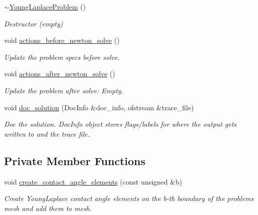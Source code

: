 \begin{DoxyCompactItemize}
\hyperlink{classYoungLaplaceProblem_aa3482606bfd86a3db9d2dec86ba75f14}{$\sim$\+Young\+Laplace\+Problem} ()
\begin{DoxyCompactList}\small\item\em Destructor (empty) \end{DoxyCompactList}\item 
void \hyperlink{classYoungLaplaceProblem_a93dd45313d28c3b9b0b51e34d14ebd24}{actions\+\_\+before\+\_\+newton\+\_\+solve} ()
\begin{DoxyCompactList}\small\item\em Update the problem specs before solve. \end{DoxyCompactList}\item 
void \hyperlink{classYoungLaplaceProblem_a8eed49ad1c6247cc293a584ab9262efc}{actions\+\_\+after\+\_\+newton\+\_\+solve} ()
\begin{DoxyCompactList}\small\item\em Update the problem after solve\+: Empty. \end{DoxyCompactList}\item 
void \hyperlink{classYoungLaplaceProblem_a16f10e66457718eca76d1335dbed8f12}{doc\+\_\+solution} (Doc\+Info \&doc\+\_\+info, ofstream \&trace\+\_\+file)
\begin{DoxyCompactList}\small\item\em Doc the solution. Doc\+Info object stores flags/labels for where the output gets written to and the trace file. \end{DoxyCompactList}\end{DoxyCompactItemize}
\subsection*{Private Member Functions}
\begin{DoxyCompactItemize}
\item 
void \hyperlink{classYoungLaplaceProblem_a3ebbc17f9f27480e720f0bd87a036a12}{create\+\_\+contact\+\_\+angle\+\_\+elements} (const unsigned \&b)
\begin{DoxyCompactList}\small\item\em Create Young\+Laplace contact angle elements on the b-\/th boundary of the problem\textquotesingle{}s mesh and add them to mesh. \end{DoxyCompactList}\end{DoxyCompactItemize}
